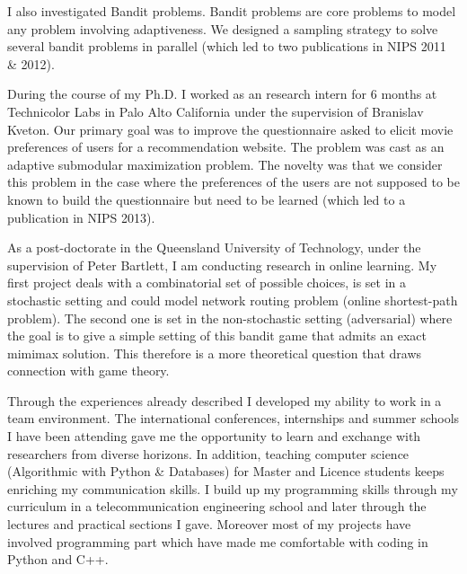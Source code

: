 I also investigated Bandit problems. Bandit problems are core problems to model any problem involving adaptiveness. We designed a sampling strategy to solve several bandit problems in parallel (which led to two publications in NIPS 2011 \& 2012).

During the course of my Ph.D. I worked as an research intern for 6 months at Technicolor Labs in Palo Alto California under the supervision of Branislav Kveton.  Our primary goal was to improve the questionnaire asked to elicit movie preferences of users for a recommendation website. The problem was cast as an adaptive submodular maximization problem. The novelty was that we consider this problem in the case where the preferences of the users are not supposed to be known to build the questionnaire but need to be learned (which led to a publication in NIPS 2013).

As a post-doctorate in the Queensland University of Technology, under the supervision of Peter Bartlett, I am conducting research in online learning.  My first project deals with a combinatorial set of possible choices, is set in a stochastic setting and could model network routing problem (online shortest-path problem). The second one is set in the non-stochastic setting (adversarial) where the goal is to give a simple setting of this bandit game that admits an exact mimimax solution. This therefore is a more theoretical question that draws connection with game theory.

Through the experiences already described I developed my ability to work in a team environment. The international conferences, internships and summer schools I have been attending gave me the opportunity to learn and exchange with researchers from diverse horizons. In addition, teaching computer science (Algorithmic with Python \& Databases) for Master and Licence students keeps enriching my communication skills. I build up my programming skills through my curriculum in a telecommunication engineering school and later through the lectures and practical sections I gave. Moreover most of my projects have involved programming part which have made me comfortable with coding in Python and  C++.

